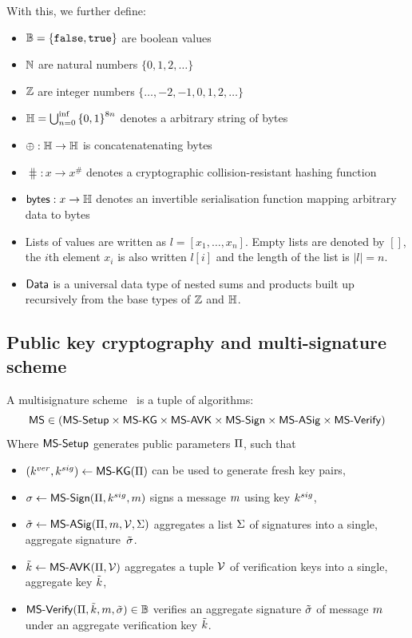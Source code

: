 \noindent With this, we further define:
\begin{itemize}
  \item $\mathbb{B} = \{\mathtt{false}, \mathtt{true}\}$ are boolean values
  \item $\mathbb{N}$ are natural numbers $\{0, 1, 2, \ldots\}$
  \item $\mathbb{Z}$ are integer numbers $\{\ldots, −2, −1, 0, 1, 2, \ldots\}$
  \item $\mathbb{H} = \bigcup_{n=0}^{\inf}{\{0,1\}}^{8n}$ denotes a arbitrary
        string of bytes
  \item $\oplus : \mathbb{H} \to \mathbb{H}$ is concatenatenating bytes
  \item $\hash : x \to x^{\#}$ denotes a cryptographic collision-resistant
        hashing function
  \item $\mathsf{bytes} : x \to \mathbb{H}$ denotes an invertible serialisation function
        mapping arbitrary data to bytes
  \item Lists of values are written as $l = [x_{1}, \ldots, x_{n}]$. Empty lists
        are denoted by $[]$, the $i$th element $x_{i}$ is also written $l[i]$
        and the length of the list is $|l| = n$.
  \item $\mathsf{Data}$ is a universal data type of nested sums and products built up
        recursively from the base types of $\mathbb{Z}$ and $\mathbb{H}$.
\end{itemize}

\subsection{Public key cryptography and multi-signature scheme}\label{sec:multisig}

A multisignature scheme~\cite{itakura1983public,CCS:MicOhtRey01} is a
tuple of algorithms:
\[
\mathsf{MS} \in (\mathsf{MS\textsf{-}{}Setup} \times \allowbreak\mathsf{MS\textsf{-}{}KG} \times \allowbreak\mathsf{MS\textsf{-}{}AVK} \times \allowbreak
\mathsf{MS\textsf{-}{}Sign} \times \allowbreak\mathsf{MS\textsf{-}{}ASig} \times \allowbreak\mathsf{MS\textsf{-}{}Verify})
\]
Where $\mathsf{MS\textsf{-}{}Setup}$ generates public parameters $\Pi$, such that
\begin{itemize}
  \item $(k^{ver},k^{sig}) \gets \mathsf{MS\textsf{-}{}KG}(\Pi)$ can be used to generate fresh
        key pairs,
  \item $\sigma \gets \mathsf{MS\textsf{-}{}Sign}(\Pi,k^{sig},m)$ signs a message $m$
        using key $k^{sig}$,
  \item $\tilde\sigma \gets \mathsf{MS\textsf{-}{}ASig}(\Pi,m,\mathcal{V},\Sigma)$ aggregates
         a list $\Sigma$ of signatures into a single,
        aggregate signature~$\tilde\sigma$.
  \item $\tilde{k} \gets \mathsf{MS\textsf{-}{}AVK}(\Pi,\mathcal{V})$ aggregates a tuple
        $\mathcal{V}$ of verification keys into a single, aggregate key
        $\tilde{k}$,
  \item $\mathsf{MS\textsf{-}{}Verify}(\Pi,\tilde{k},m,\tilde\sigma) \in \mathbb{B}$ verifies an aggregate
        signature $\tilde\sigma$ of message $m$ under an aggregate verification
        key $\tilde{k}$.
\end{itemize}

